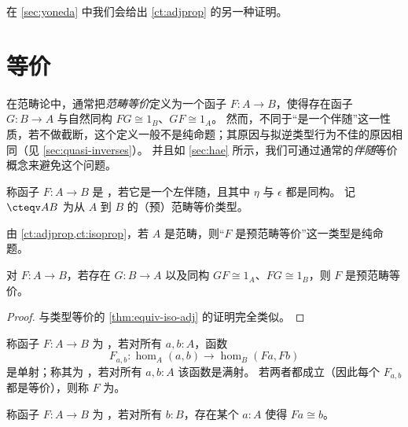 在 \cref{sec:yoneda} 中我们会给出 \cref{ct:adjprop} 的另一种证明。

\section{等价}
\label{sec:equivalences}

在范畴论中，通常把\emph{范畴等价}定义为一个函子 $F:A\to B$，使得存在函子 $G:B\to A$ 与自然同构 $F G \cong 1_B$、$G F \cong 1_A$。
然而，不同于“是一个伴随”这一性质，若不做截断，这个定义一般不是纯命题；其原因与拟逆类型行为不佳的原因相同（见 \cref{sec:quasi-inverses}）。
并且如 \cref{sec:hae} 所示，我们可通过通常的\emph{伴随}等价概念来避免这个问题。

\begin{defn}\label{ct:equiv}
  称函子 $F:A\to B$ 是
  ，若它是一个左伴随，且其中 $\eta$ 与 $\epsilon$ 都是同构。
  记 $\cteqv A B$ 为从 $A$ 到 $B$ 的（预）范畴等价类型。
\end{defn}

由 \cref{ct:adjprop,ct:isoprop}，若 $A$ 是范畴，则“$F$ 是预范畴等价”这一类型是纯命题。

\begin{lem}\label{ct:adjointification}
  对 $F:A\to B$，若存在 $G:B\to A$ 以及同构 $GF\cong 1_A$、$FG\cong 1_B$，则 $F$ 是预范畴等价。
\end{lem}
\begin{proof}
  与类型等价的 \cref{thm:equiv-iso-adj} 的证明完全类似。
\end{proof}

\begin{defn}\label{ct:full-faithful}
  称函子 $F:A\to B$ 为
  ，若对所有 $a,b:A$，函数
  \[F_{a,b}:\hom_A(a,b) \to \hom_B(Fa,Fb)\]
  是单射；称其为
  ，若对所有 $a,b:A$ 该函数是满射。
  若两者都成立（因此每个 $F_{a,b}$ 都是等价），则称 $F$ 为。
\end{defn}

\begin{defn}\label{ct:split-essentially-surjective}
  称函子 $F:A\to B$ 为
  ，若对所有 $b:B$，存在某个 $a:A$ 使得 $Fa\cong b$。
\end{defn}

